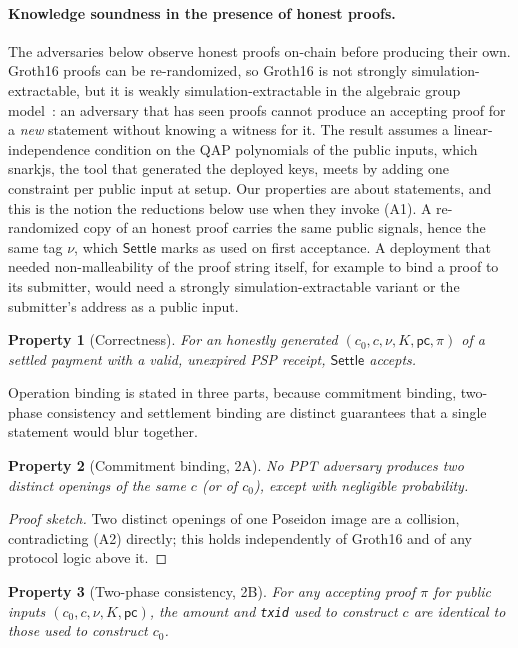 \documentclass[11pt]{article}
\newtheorem{property}{Property}
\newcommand{\code}[1]{\texttt{#1}}
\begin{document}
\paragraph{Knowledge soundness in the presence of honest proofs.}
The adversaries below observe honest proofs on-chain before producing their
own. Groth16 proofs can be re-randomized, so Groth16 is not strongly
simulation-extractable, but it is weakly simulation-extractable in the
algebraic group model~\cite{bksv}: an adversary that has seen proofs cannot
produce an accepting proof for a \emph{new} statement without knowing a witness
for it. The result assumes a linear-independence condition on the QAP
polynomials of the public inputs, which snarkjs, the tool that generated the
deployed keys, meets by adding one constraint per public input at setup. Our
properties are about statements, and this is the notion the reductions below
use when they invoke (A1). A re-randomized copy of an honest
proof carries the same public signals, hence the same tag $\nu$, which
$\mathsf{Settle}$ marks as used on first acceptance. A deployment that needed
non-malleability of the proof string itself, for example to bind a proof to
its submitter, would need a strongly simulation-extractable variant or the
submitter's address as a public input.

\begin{property}[Correctness]
\label{prop:correctness}
For an honestly generated $(c_0,c,\nu,K,\mathsf{pc},\pi)$ of a settled payment
with a valid, unexpired PSP receipt, $\mathsf{Settle}$ accepts.
\end{property}

Operation binding is stated in three parts, because commitment binding,
two-phase consistency and settlement binding are distinct guarantees that a
single statement would blur together.

\begin{property}[Commitment binding, 2A]
\label{prop:binding}
No PPT adversary produces two distinct openings of the same $c$ (or of $c_0$),
except with negligible probability.
\end{property}
\begin{proof}[Proof sketch]
Two distinct openings of one Poseidon image are a collision, contradicting (A2)
directly; this holds independently of Groth16 and of any protocol logic above
it.
\end{proof}

\begin{property}[Two-phase consistency, 2B]
\label{prop:twophase}
For any accepting proof $\pi$ for public inputs $(c_0,c,\nu,K,\mathsf{pc})$,
the amount and \code{txid} used to construct $c$ are identical to those
used to construct $c_0$.
\end{property}
\end{document}
